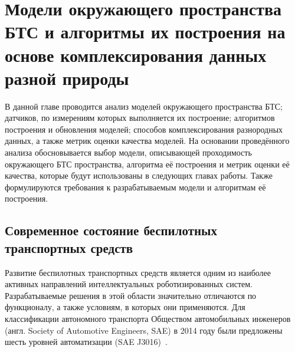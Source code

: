 \chapter{Модели окружающего пространства БТС и алгоритмы их построения на основе комплексирования данных разной природы}\label{ch:ch1}

В данной главе проводится анализ моделей окружающего пространства БТС; датчиков, по измерениям которых выполняется их построение; алгоритмов построения и обновления моделей; способов комплексирования разнородных данных, а также метрик оценки качества моделей. На основании проведённого анализа обосновывается выбор модели, описывающей проходимость окружающего БТС пространства, алгоритма её построения и метрик оценки её качества, которые будут использованы в следующих главах работы. Также формулируются требования к разрабатываемым модели и алгоритмам её построения.

\section{Современное состояние беспилотных транспортных средств}\label{sec:ch1/state}

Развитие беспилотных транспортных средств является одним из наиболее активных направлений интеллектуальных роботизированных систем. Разрабатываемые решения в этой области значительно отличаются по функционалу, а также условиям, в которых они применяются. Для классификации автономного транспорта Обществом автомобильных инженеров (англ. Society of Automotive Engineers, SAE) в 2014 году были предложены шесть уровней автоматизации (SAE J3016)~\cite{sae2014taxonomy}. 

